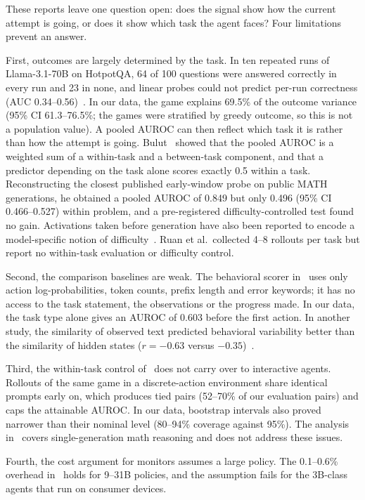 \documentclass[11pt]{article}
\begin{document}
These reports leave one question open: does the signal show how the current attempt is going, or does it show which task the agent faces? Four limitations prevent an answer.

First, outcomes are largely determined by the task. In ten repeated runs of Llama-3.1-70B on HotpotQA, 64 of 100 questions were answered correctly in every run and 23 in none, and linear probes could not predict per-run correctness (AUC 0.34--0.56)~\cite{mehta2026commit}.
In our data, the game explains 69.5\% of the outcome variance (95\% CI 61.3--76.5\%; the games were stratified by greedy outcome, so this is not a population value). A pooled AUROC can then reflect which task it is rather than how the attempt is going.
Bulut~\cite{bulut2026problem} showed that the pooled AUROC is a weighted sum of a within-task and a between-task component, and that a predictor depending on the task alone scores exactly 0.5 within a task.
Reconstructing the closest published early-window probe on public MATH generations, he obtained a pooled AUROC of 0.849 but only 0.496 (95\% CI 0.466--0.527) within problem, and a pre-registered difficulty-controlled test found no gain.
Activations taken before generation have also been reported to encode a model-specific notion of difficulty~\cite{lugoloobi2026failures}. Ruan et al.\ collected 4--8 rollouts per task but report no within-task evaluation or difficulty control.

Second, the comparison baselines are weak. The behavioral scorer in~\cite{ruan2026doomed} uses only action log-probabilities, token counts, prefix length and error keywords; it has no access to the task statement, the observations or the progress made.
In our data, the task type alone gives an AUROC of 0.603 before the first action. In another study, the similarity of observed text predicted behavioral variability better than the similarity of hidden states ($r=-0.63$ versus $-0.35$)~\cite{mehta2026commit}.

Third, the within-task control of~\cite{bulut2026problem} does not carry over to interactive agents. Rollouts of the same game in a discrete-action environment share identical prompts early on, which produces tied pairs (52--70\% of our evaluation pairs)
and caps the attainable AUROC. In our data, bootstrap intervals also proved narrower than their nominal level (80--94\% coverage against 95\%). The analysis in~\cite{bulut2026problem} covers single-generation math reasoning and does not address these issues.

Fourth, the cost argument for monitors assumes a large policy. The 0.1--0.6\% overhead in~\cite{wang2026failfast} holds for 9--31B policies, and the assumption fails for the 3B-class agents that run on consumer devices.
\end{document}
